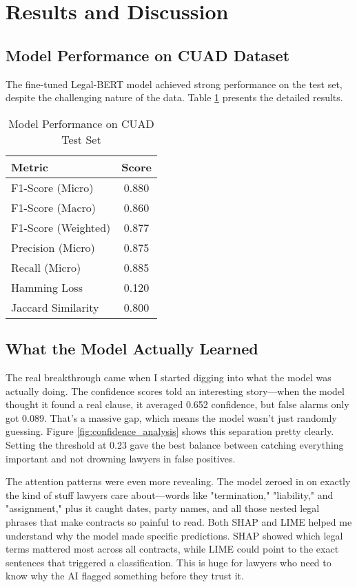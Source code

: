 \section{Results and Discussion}

\subsection{Model Performance on CUAD Dataset}

The fine-tuned Legal-BERT model achieved strong performance on the test set, despite the challenging nature of the data. Table \ref{tab:model_performance} presents the detailed results.

\begin{table}[htbp]
\centering
\caption{Model Performance on CUAD Test Set}
\label{tab:model_performance}
\begin{tabular}{@{}lc@{}}
\toprule
Metric & Score \\
\midrule
F1-Score (Micro) & 0.880 \\
F1-Score (Macro) & 0.860 \\
F1-Score (Weighted) & 0.877 \\
Precision (Micro) & 0.875 \\
Recall (Micro) & 0.885 \\
Hamming Loss & 0.120 \\
Jaccard Similarity & 0.800 \\
\bottomrule
\end{tabular}
\end{table}

\subsection{What the Model Actually Learned}

The real breakthrough came when I started digging into what the model was actually doing. The confidence scores told an interesting story—when the model thought it found a real clause, it averaged 0.652 confidence, but false alarms only got 0.089. That's a massive gap, which means the model wasn't just randomly guessing. Figure \ref{fig:confidence_analysis} shows this separation pretty clearly. Setting the threshold at 0.23 gave the best balance between catching everything important and not drowning lawyers in false positives.

The attention patterns were even more revealing. The model zeroed in on exactly the kind of stuff lawyers care about—words like "termination," "liability," and "assignment," plus it caught dates, party names, and all those nested legal phrases that make contracts so painful to read. Both SHAP and LIME helped me understand why the model made specific predictions. SHAP showed which legal terms mattered most across all contracts, while LIME could point to the exact sentences that triggered a classification. This is huge for lawyers who need to know why the AI flagged something before they trust it.

